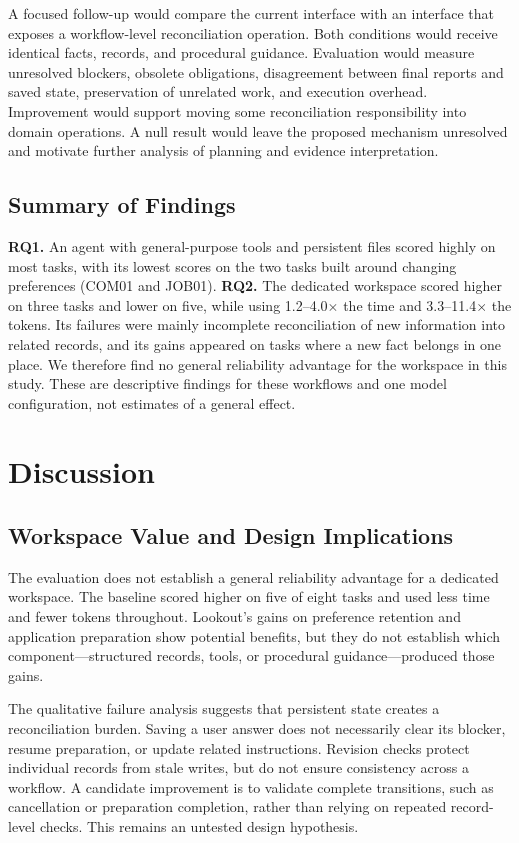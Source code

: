 \documentclass[twocolumn]{article}
\begin{document}
A focused follow-up would compare the current interface with an interface that exposes a workflow-level reconciliation operation. Both conditions would receive identical facts, records, and procedural guidance. Evaluation would measure unresolved blockers, obsolete obligations, disagreement between final reports and saved state, preservation of unrelated work, and execution overhead. Improvement would support moving some reconciliation responsibility into domain operations. A null result would leave the proposed mechanism unresolved and motivate further analysis of planning and evidence interpretation.

\subsection{Summary of Findings}
\textbf{RQ1.} An agent with general-purpose tools and persistent files scored highly on most tasks, with its lowest scores on the two tasks built around changing preferences (COM01 and JOB01). \textbf{RQ2.} The dedicated workspace scored higher on three tasks and lower on five, while using 1.2--4.0$\times$ the time and 3.3--11.4$\times$ the tokens. Its failures were mainly incomplete reconciliation of new information into related records, and its gains appeared on tasks where a new fact belongs in one place. We therefore find no general reliability advantage for the workspace in this study. These are descriptive findings for these workflows and one model configuration, not estimates of a general effect.

\section{Discussion}

\subsection{Workspace Value and Design Implications}

The evaluation does not establish a general reliability advantage for a dedicated workspace. The baseline scored higher on five of eight tasks and used less time and fewer tokens throughout. Lookout's gains on preference retention and application preparation show potential benefits, but they do not establish which component---structured records, tools, or procedural guidance---produced those gains.

The qualitative failure analysis suggests that persistent state creates a reconciliation burden. Saving a user answer does not necessarily clear its blocker, resume preparation, or update related instructions. Revision checks protect individual records from stale writes, but do not ensure consistency across a workflow. A candidate improvement is to validate complete transitions, such as cancellation or preparation completion, rather than relying on repeated record-level checks. This remains an untested design hypothesis.
\end{document}
